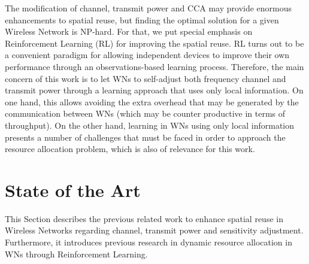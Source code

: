 \documentclass[12pt, a4paper,twoside]{tesi_upf}
\begin{document}
			The modification of channel, transmit power and CCA may provide enormous enhancements to spatial reuse, but finding the optimal solution for a given Wireless Network is NP-hard. For that, we put special emphasis on Reinforcement Learning (RL) for improving the spatial reuse. RL turns out to be a convenient paradigm for allowing independent devices to improve their own performance through an observations-based learning process. Therefore, the main concern of this work is to let WNs to self-adjust both frequency channel and transmit power through a learning approach that uses only local information. On one hand, this allows avoiding the extra overhead that may be generated by the communication between WNs (which may be counter productive in terms of throughput). On the other hand, learning in WNs using only local information presents a number of challenges that must be faced in order to approach the resource allocation problem, which is also of relevance for this work.		

	\chapter{State of the Art}
	\label{section:state_of_the_art}
		This Section describes the previous related work to enhance spatial reuse in Wireless Networks regarding channel, transmit power and sensitivity adjustment. Furthermore, it introduces previous research in dynamic resource allocation in WNs through Reinforcement Learning.		
			
\end{document}
